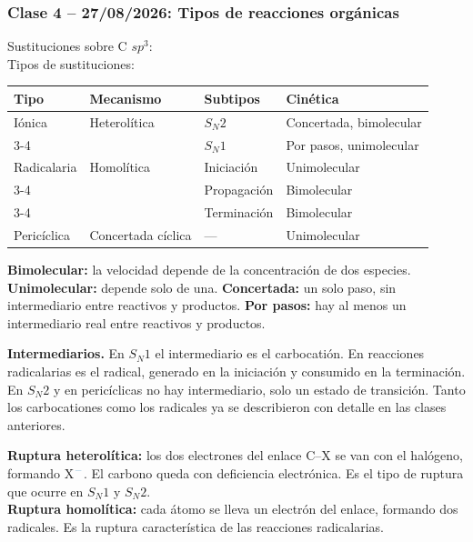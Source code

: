 {}
\subsubsection*{\textcolor{blueunam}{Clase 4 -- 27/08/2026: Tipos de reacciones orgánicas}}

Sustituciones sobre C $sp^3$: \\
Tipos de sustituciones: \\

\begin{center}
\begin{tabular}{|l|l|l|l|}
\hline
\textbf{Tipo} & \textbf{Mecanismo} & \textbf{Subtipos} & \textbf{Cinética} \\
\hline
Iónica & Heterolítica & $S_N2$ & Concertada, bimolecular \\
\cline{3-4}
       &               & $S_N1$ & Por pasos, unimolecular \\
\hline
Radicalaria & Homolítica & Iniciación & Unimolecular \\
\cline{3-4}
            &            & Propagación & Bimolecular \\
\cline{3-4}
            &            & Terminación & Bimolecular \\
\hline
Pericíclica & Concertada cíclica & --- & Unimolecular \\
\hline
\end{tabular}
\end{center}

\textbf{Bimolecular:} la velocidad depende de la concentración de dos 
especies. \textbf{Unimolecular:} depende solo de una. \textbf{Concertada:} 
un solo paso, sin intermediario entre reactivos y productos. \textbf{Por 
pasos:} hay al menos un intermediario real entre reactivos y productos.

\textbf{Intermediarios.} En $S_N1$ el intermediario es el carbocatión. En 
reacciones radicalarias es el radical, generado en la iniciación y consumido 
en la terminación. En $S_N2$ y en pericíclicas no hay intermediario, solo un 
estado de transición. Tanto los carbocationes como los radicales ya se 
describieron con detalle en las clases anteriores.

\textbf{Ruptura heterolítica:} los dos electrones del enlace C--X se van con el halógeno,
formando X$^{\color{anblue}-}$. El carbono queda con deficiencia electrónica. Es el tipo de ruptura que ocurre en $S_N1$ y $S_N2$. \\
\textbf{Ruptura homolítica:} cada átomo se lleva un electrón del enlace, formando dos radicales.
Es la ruptura característica de las reacciones radicalarias. \\

